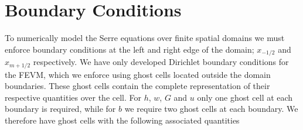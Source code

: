 \section{Boundary Conditions}
To numerically model the Serre equations over finite spatial domains we must enforce boundary conditions at the left and right edge of the domain; $x_{-1/2}$ and $x_{m+1/2}$ respectively. We have only developed Dirichlet boundary conditions for the FEVM, which we enforce using ghost cells located outside the domain boundaries. These ghost cells contain the complete representation of their respective quantities over the cell. For $h$, $w$, $G$ and $u$ only one ghost cell at each boundary is required, while for $b$ we require two ghost cells at each boundary. We therefore have ghost cells with the following associated quantities

